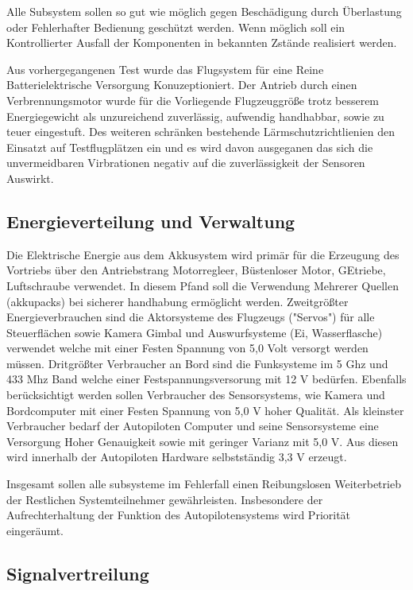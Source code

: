 Alle Subsystem sollen so gut wie möglich gegen Beschädigung durch Überlastung oder Fehlerhafter Bedienung geschützt werden.
Wenn möglich soll ein Kontrollierter Ausfall der Komponenten in bekannten Zstände realisiert werden.

Aus vorhergegangenen Test wurde das Flugsystem für eine Reine Batterielektrische Versorgung Konuzeptioniert.
Der Antrieb durch einen Verbrennungsmotor wurde für die Vorliegende Flugzeuggröße trotz besserem Energiegewicht als unzureichend zuverlässig, aufwendig handhabbar, sowie zu teuer eingestuft.
Des weiteren schränken bestehende Lärmschutzrichtlienien den Einsatzt auf Testflugplätzen ein und es wird davon ausgeganen das sich die unvermeidbaren Virbrationen negativ auf die zuverlässigkeit der Sensoren Auswirkt.

\subsection{Energieverteilung und Verwaltung}

Die Elektrische Energie aus dem Akkusystem wird primär für die Erzeugung des Vortriebs über den Antriebstrang Motorregleer, Büstenloser Motor, GEtriebe, Luftschraube verwendet.
In diesem Pfand soll die Verwendung Mehrerer Quellen (akkupacks) bei sicherer handhabung ermöglicht werden.
Zweitgrößter Energieverbrauchen sind die Aktorsysteme des Flugzeugs ("Servos") für alle Steuerflächen sowie Kamera Gimbal und Auswurfsysteme (Ei, Wasserflasche) verwendet welche mit einer Festen Spannung von 5,0 Volt versorgt werden müssen.
Dritgrößter Verbraucher an Bord sind die Funksysteme im 5 Ghz und 433 Mhz Band welche einer Festspannungsversorung mit 12 V  bedürfen.
Ebenfalls berücksichtigt werden sollen Verbraucher des Sensorsystems, wie Kamera und Bordcomputer mit einer Festen Spannung von 5,0 V hoher Qualität.
Als kleinster Verbraucher bedarf der Autopiloten Computer und seine Sensorsysteme eine Versorgung Hoher Genauigkeit sowie mit geringer Varianz mit 5,0 V.
Aus diesen wird innerhalb der Autopiloten Hardware selbstständig 3,3 V erzeugt.

Insgesamt sollen alle subsysteme im Fehlerfall einen Reibungslosen Weiterbetrieb der Restlichen Systemteilnehmer gewährleisten. Insbesondere der Aufrechterhaltung der Funktion des Autopilotensystems wird Priorität eingeräumt.


\subsection{Signalvertreilung}

